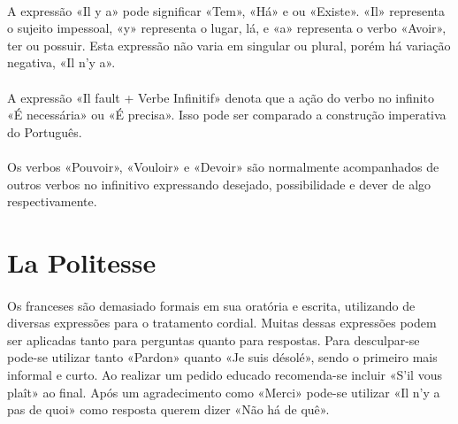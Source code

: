 \documentclass{article}
\begin{document}
        \paragraph{}A expressão «Il y a» pode significar «Tem», «Há» e ou «Existe». «Il» representa o sujeito impessoal, «y» representa o lugar, lá, e «a» representa o verbo «Avoir», ter ou possuir. Esta expressão não varia em singular  ou plural, porém há variação negativa, «Il n'y a».

        \paragraph{}A expressão «Il fault + Verbe Infinitif» denota que a ação do verbo no infinito «É necessária» ou «É precisa». Isso pode ser comparado a construção imperativa do Português. 

        \paragraph{}Os verbos «Pouvoir», «Vouloir» e «Devoir» são normalmente acompanhados de outros verbos no infinitivo expressando desejado, possibilidade e dever de algo respectivamente.
\newpage

\section{La Politesse}
    \paragraph{}Os franceses são demasiado formais em sua oratória e escrita, utilizando de diversas expressões para o tratamento cordial. Muitas dessas expressões podem ser aplicadas tanto para perguntas quanto para respostas. Para desculpar-se pode-se utilizar tanto «Pardon» quanto «Je suis désolé», sendo o primeiro mais informal e curto. Ao realizar um pedido educado recomenda-se incluir «S'il vous plaît» ao final. Após um agradecimento como «Merci» pode-se utilizar «Il n'y a pas de quoi» como resposta querem dizer «Não há de quê».
        
\end{document}
